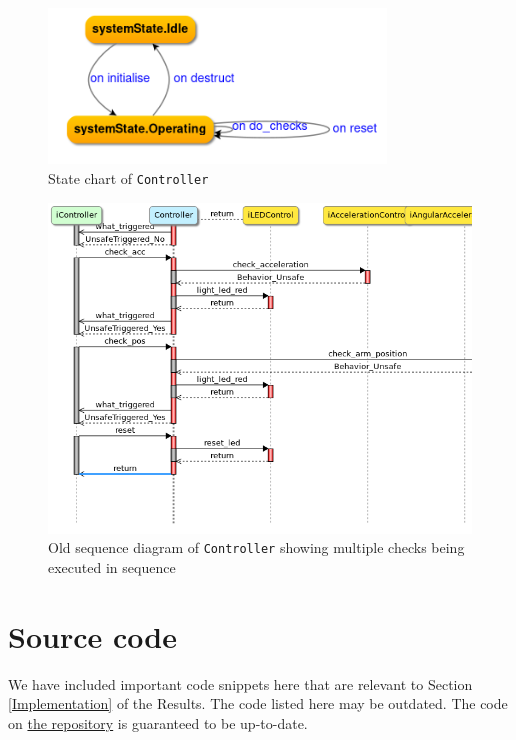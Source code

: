 \documentclass[12pt]{scrreprt}
\begin{document}
\begin{appendices}
\begin{figure}[H]
    \centering
    \includegraphics[width=0.8\textwidth]{Figures/results/modelling_figures/Controller/Controller_state_chart.png}
    \caption{State chart of \texttt{Controller}}
    \label{fig:controll_old}
\end{figure}


\begin{figure}[H]
    \centering
    \includegraphics[width=\textwidth]{Figures/results/modelling_figures/Controller/old_Controller_seq.png}
    \caption{Old sequence diagram of \texttt{Controller} showing multiple checks being executed in sequence}
    \label{fig:controll_old}
\end{figure}



\chapter{Source code}
\label{Source code}
We have included important code snippets here that are relevant to Section \ref{Implementation} of the Results. The code listed here may be outdated. The code on \href{https://github.com/Yousousen/safety-module-for-care-robot-rose}{the repository} is guaranteed to be up-to-date.


\end{appendices}
\end{document}
